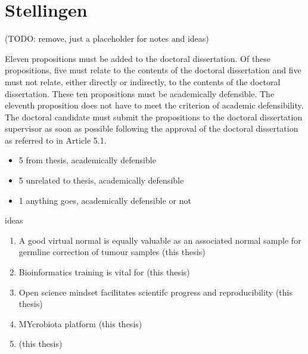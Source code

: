 \chapter*{Stellingen}

(TODO: remove, just a placeholder for notes and ideas)


Eleven propositions must be added to the doctoral dissertation. Of these propositions,
five must relate to the contents of the doctoral dissertation and five must not relate,
either directly or indirectly, to the contents of the doctoral dissertation. These ten
propositions must be academically defensible. The eleventh proposition does not have
to meet the criterion of academic defensibility. The doctoral candidate must submit the
propositions to the doctoral dissertation supervisor as soon as possible following the
approval of the doctoral dissertation as referred to in Article 5.1.

\begin{itemize}
\item 5 from thesis, academically defensible
\item 5 unrelated to thesis, academically defensible
\item 1 anything goes, academically defensible or not
\end{itemize}

ideas

\begin{enumerate}
\item A good virtual normal is equally valuable as an associated normal sample for germline correction of tumour samples (this thesis)
\item Bioinformatics training is vital for  (this thesis)
\item Open science mindset facilitates scientifc progress and reproducibility (this thesis)
\item MYcrobiota platform (this thesis)
\item (this thesis)

\end{enumerate}

